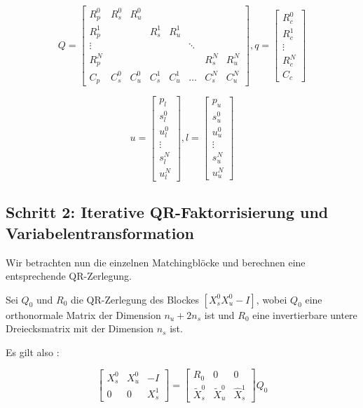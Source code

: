 $$Q=\left[ \begin{array}{cccccccc}
R_p^0 & R_s^0 & R_u^0 &  &  &  &  &  \\ 
R_p^1 &  &  & R_s^1 & R_u^1 &  &  &  \\ 
\vdots &  &  &  &  & \ddots &  &  \\ 
R_p^{N} &  &  &  &  &  & R_s^{N} & R_u^{N} \\ 
C_p & C_s^0 & C_u^0 & C_s^1 & C_u^1 & \hdots & C_s^{N} & C_u^{N}
\end{array}  \right],
q= \left[ \begin{array}{c}
R_c^0 \\ 
R_c^1 \\ 
\vdots \\ 
R_c^{N} \\ 
C_c
\end{array}  \right]$$

$$u= \left[ \begin{array}{c}
p_l \\ 
s^0_l \\ 
u^0_l \\ 
\vdots \\ 
s^{N}_l \\ 
u^{N}_l
\end{array} \right],
l= \left[ \begin{array}{c}
p_u \\ 
s^0_u \\ 
u^0_u \\ 
\vdots \\ 
s^{N}_u \\ 
u^{N}_u
\end{array} \right]$$

\subsection*{Schritt 2: Iterative QR-Faktorrisierung und Variabelentransformation}

Wir betrachten nun die einzelnen Matchingblöcke und berechnen eine entsprechende QR-Zerlegung. 

Sei $Q_0$ und $R_0$ die QR-Zerlegung des Blockes $[X_s^0 X_u^0 -I]$, wobei $Q_0$ eine orthonormale Matrix der Dimension $n_u+2n_s$ ist und $R_0$ eine invertierbare untere Dreiecksmatrix mit der Dimension $n_s$ ist.

Es gilt also :

$$\left[ \begin{array}{ccc}
X_s^0 &  X_u^0 & -I \\ 
0 & 0 & X_s^1
\end{array}\right]
= \left[ 
\begin{array}{ccc} 
R_0 & 0 & 0 \\
\tilde{X}^0_s & \tilde{X}^0_u & \hat{X}^1_s 
\end{array}\right]Q_0$$


